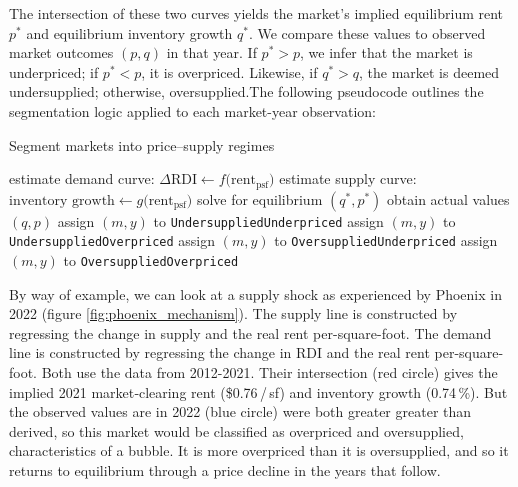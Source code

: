 \documentclass[APA,Times1COL]{WileyNJDv5} %
\begin{document}
The intersection of these two curves yields the market's implied equilibrium rent \( p^* \) and equilibrium inventory growth \( q^* \). We compare these values to observed market outcomes \( (p, q) \) in that year. If \( p^* > p \), we infer that the market is underpriced; if \( p^* < p \), it is overpriced. Likewise, if \( q^* > q \), the market is deemed undersupplied; otherwise, oversupplied.The following pseudocode outlines the segmentation logic applied to each market-year observation:
\begin{algorithm}[h!]
	\caption{\enskip Segment markets into price–supply regimes}\label{alg:market_segmentation}
	\begin{algorithmic}
		\State estimate demand curve: $\Delta\text{RDI} \gets f\!\bigl(\text{rent}_{\text{psf}}\bigr)$
		\State estimate supply curve: $\text{inventory growth} \gets g\!\bigl(\text{rent}_{\text{psf}}\bigr)$
		\State solve for equilibrium $(q^{\ast},p^{\ast})$
		\State obtain actual values $(q,p)$
		\State assign $(m,y)$ to \texttt{UndersuppliedUnderpriced}
		\Else
		\State assign $(m,y)$ to \texttt{UndersuppliedOverpriced}
		\EndIf
		\Else
		\State assign $(m,y)$ to \texttt{OversuppliedUnderpriced}
		\Else
		\State assign $(m,y)$ to \texttt{OversuppliedOverpriced}
		\EndIf
		\EndIf
		\EndFor
		\EndFor
	\end{algorithmic}
\end{algorithm}

By way of example, we can look at a supply shock as experienced by Phoenix in 2022 (figure \ref{fig:phoenix_mechanism}). The supply line is constructed by regressing the change in supply and the real rent per-square-foot. The demand line is constructed by regressing the change in RDI and the real rent per-square-foot. Both use the data from 2012-2021. Their intersection (red circle) gives the implied 2021 market‑clearing rent (\$0.76 / sf) and inventory growth (0.74 \%). But the observed values are in 2022 (blue circle) were both greater greater than derived, so this market would be classified as overpriced and oversupplied, characteristics of a bubble. It is more overpriced than it is oversupplied, and so it returns to equilibrium through a price decline in the years that follow. 
\end{document}
